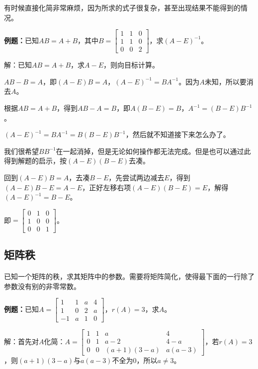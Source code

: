 有时候直接化简非常麻烦，因为所求的式子很复杂，甚至出现结果不能得到的情况。

\textbf{例题：}已知$AB=A+B$，其中$B=\left[\begin{array}{ccc}
    1 & 1 & 0 \\
    1 & 1 & 0 \\
    0 & 0 & 2
\end{array}\right]$，求$(A-E)^{-1}$。

解：已知$AB=A+B$，求$A-E$，则向目标计算。

$AB-B=A$，即$(A-E)B=A$，$(A-E)^{-1}=BA^{-1}$。因为$A$未知，所以要消去$A$。

根据$AB=A+B$，得到$AB-A=B$，即$A(B-E)=B$，$A^{-1}=(B-E)B^{-1}$。

$(A-E)^{-1}=BA^{-1}=B(B-E)B^{-1}$，然后就不知道接下来怎么办了。

我们很希望$BB^{-1}$在一起消掉，但是无论如何操作都无法完成。但是也可以通过此得到解题的启示，按$(A-E)(B-E)$去凑。

回到$(A-E)B=A$，去凑$B-E$，先尝试两边减去$E$，得到$(A-E)B-E=A-E$，正好左移右项$(A-E)(B-E)=E$，解得$(A-E)^{-1}=B-E$。

即$=\left[\begin{array}{ccc}
    0 & 1 & 0 \\
    1 & 0 & 0 \\
    0 & 0 & 1
\end{array}\right]$。

\subsection{矩阵秩}

\paragraph{}

已知一个矩阵的秩，求其矩阵中的参数。需要将矩阵简化，使得最下面的一行除了参数没有别的非零常数。

\textbf{例题：}已知$A=\left[\begin{array}{cccc}
    1 & 1 & a & 4 \\
    1 & 0 & 2 & a \\
    -1 & a & 1 & 0
\end{array}\right]$，$r(A)=3$，求$A$。

解：首先对$A$化简：$A=\left[\begin{array}{cccc}
    1 & 1 & a & 4 \\
    0 & 1 & a-2 & 4-a \\
    0 & 0 & (a+1)(3-a) & a(a-3)
\end{array}\right]$，若$r(A)=3$，则$(a+1)(3-a)$与$a(a-3)$不全为0，所以$a\neq3$。

